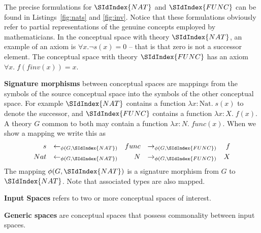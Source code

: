 The precise formulations for $\SIdIndex{NAT}$ and $ \SIdIndex{FUNC}$ can
be found in Listings~\ref{fig:nats} and \ref{fig:inv}. 
Notice that these formulations obviously refer to 
partial representations of the genuine concepts
employed by mathematicians.  
In the conceptual space with theory $\SIdIndex{NAT}$, an example of an axiom is 
$\forall x. \neg s(x) = 0$ -- that is that zero is not a successor element.
The conceptual space with theory $\SIdIndex{FUNC}$ has an axiom
$\forall x.\;f(finv(x)) = x$. 

{\bf Signature morphisms} between conceptual spaces are mappings from
the symbols of the source conceptual space into the symbols of the other
conceptual space. For example $\SIdIndex{NAT}$ contains a function $\lambda
x:\textrm{Nat}.\;s(x)$ to denote the successor, and $\SIdIndex{FUNC}$ contains a function
$\lambda x:X.\;f(x)$. 
A theory $G$ common to both may contain a function
$\lambda x:N.\;func(x)$. 
When we show a mapping %
we write 
this as
\begin{align}
s&&\leftarrow_{\phi(G,\SIdIndex{NAT})}&&func&&\rightarrow_{\phi(G,\SIdIndex{FUNC})}&&f\\
Nat&&\leftarrow_{\phi(G,\SIdIndex{NAT})}&&N&&\rightarrow_{\phi(G,\SIdIndex{FUNC})}&&X
\end{align}
\noindent The mapping $\phi(G,\SIdIndex{NAT})$ is a signature morphism from
$G$ to $\SIdIndex{NAT}$. Note that associated types are also mapped.

{\bf Input Spaces} refers to two or more conceptual spaces of
interest. 

{\bf Generic spaces} are conceptual spaces that possess commonality
between input spaces. 

